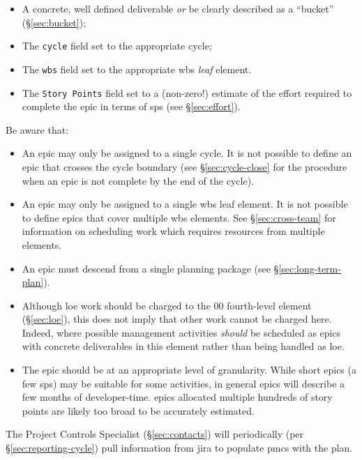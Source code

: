 \begin{itemize}
\item
  A concrete, well defined deliverable \emph{or} be clearly described as a ``bucket'' (\S\ref{sec:bucket});
\item
  The \texttt{cycle} field set to the appropriate \gls{cycle};
\item
  The \texttt{wbs} field set to the appropriate \gls{wbs} \emph{leaf} \gls{element}.
\item
  The \texttt{Story Points} field set to a (non-zero!) estimate of the effort required to complete the \gls{epic} in terms of \glspl{sp} (see \S\ref{sec:effort}).
\end{itemize}

Be aware that:

\begin{itemize}
\item
  An \gls{epic} may only be assigned to a single \gls{cycle}.
  It is not possible to define an \gls{epic} that crosses the \gls{cycle} boundary (see \S\ref{sec:cycle-close} for the procedure when an \gls{epic} is not complete by the end of the \gls{cycle}).
\item
  An \gls{epic} may only be assigned to a single \gls{wbs} leaf \gls{element}.
  It is not possible to define \glspl{epic} that cover multiple \gls{wbs} \glspl{element}.
  See \S\ref{sec:cross-team} for information on scheduling work which requires resources from multiple \glspl{element}.
\item
  An \gls{epic} must descend from a single planning package (see \S\ref{sec:long-term-plan}).
\item
  Although \gls{loe} work should be charged to the 00 fourth-level \gls{element} (\S\ref{sec:loe}), this does not imply that other work cannot be charged here.
  Indeed, where possible management activities \emph{should} be scheduled as \glspl{epic} with concrete deliverables in this \gls{element} rather than being handled as \gls{loe}.
\item
  The \gls{epic} should be at an appropriate level of granularity.
  While short \glspl{epic} (a few \glspl{sp}) may be suitable for some activities, in general \glspl{epic} will describe a few months of developer-time.
  \Glspl{epic} allocated multiple hundreds of \gls{story} points are likely too broad to be accurately estimated.
\end{itemize}

The Project Controls Specialist (\S\ref{sec:contacts}) will periodically (per \S\ref{sec:reporting-cycle}) pull information from \gls{jira} to populate \gls{pmcs} with the plan.

